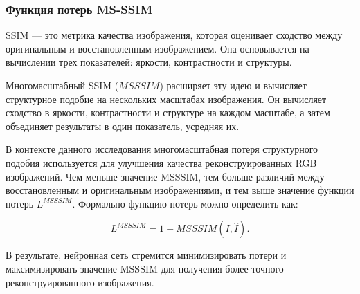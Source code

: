 \subsubsection{Функция потерь MS-SSIM}

SSIM — это метрика качества изображения, которая оценивает сходство между оригинальным и восстановленным изображением. Она основывается на вычислении трех показателей: яркости, контрастности и структуры.

Многомасштабный SSIM ($MSSSIM$) расширяет эту идею и вычисляет структурное подобие на нескольких масштабах изображения. Он вычисляет сходство в яркости, контрастности и структуре на каждом масштабе, а затем объединяет результаты в один показатель, усредняя их.

В контексте данного исследования многомасштабная потеря структурного подобия используется для улучшения качества реконструированных RGB изображений. Чем меньше значение MSSSIM, тем больше различий между восстановленным и оригинальным изображениями, и тем выше значение функции потерь $L^{MSSSIM}$. Формально функцию потерь можно определить как:

\begin{equation}
    \label{eq:2-1-3-3}
    L^{MSSSIM} = 1 - MSSSIM(I, \hat{I}).
\end{equation}

В результате, нейронная сеть стремится минимизировать потери и максимизировать значение MSSSIM для получения более точного реконструированного изображения.